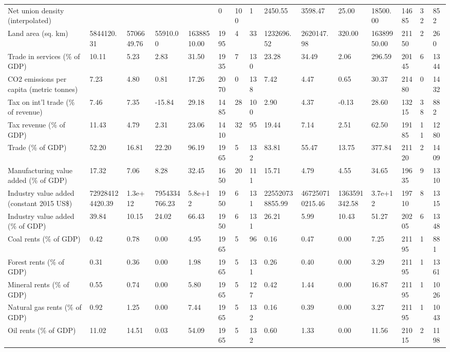 \begin{longtable}{lllllllllllllll}
Net union density (interpolated) &  &  &  &  & 0 & 100 & 1 & 2450.55 & 3598.47 & 25.00 & 18500.00 & 14685 & 32 & 852\\
Land area (sq. km) & 5844120.31 & 5706649.76 & 55910.00 & 16388510.00 & 1995 & 4 & 33 & 1232696.52 & 2620147.98 & 320.00 & 16389950.00 & 21150 & 2 & 260\\
\addlinespace
Trade in services (\% of GDP) & 10.11 & 5.23 & 2.83 & 31.50 & 1935 & 7 & 130 & 23.28 & 34.49 & 2.06 & 296.59 & 20145 & 6 & 1344\\
CO2 emissions per capita (metric tonnes) & 7.23 & 4.80 & 0.81 & 17.26 & 2070 & 0 & 138 & 7.42 & 4.47 & 0.65 & 30.37 & 21480 & 0 & 1432\\
Tax on int'l trade (\% of revenue) & 7.46 & 7.35 & -15.84 & 29.18 & 1485 & 28 & 100 & 2.90 & 4.37 & -0.13 & 28.60 & 13215 & 38 & 882\\
Tax revenue (\% of GDP) & 11.43 & 4.79 & 2.31 & 23.06 & 1410 & 32 & 95 & 19.44 & 7.14 & 2.51 & 62.50 & 19185 & 11 & 1280\\
Trade (\% of GDP) & 52.20 & 16.81 & 22.20 & 96.19 & 1965 & 5 & 132 & 83.81 & 55.47 & 13.75 & 377.84 & 21120 & 2 & 1409\\
\addlinespace
Manufacturing value added (\% of GDP) & 17.32 & 7.06 & 8.28 & 32.45 & 1650 & 20 & 111 & 15.71 & 4.79 & 4.55 & 34.65 & 19635 & 9 & 1310\\
Industry value added (constant 2015 US\$) & 729284124420.39 & 1.3e+12 & 7954334766.23 & 5.8e+12 & 1950 & 6 & 131 & 225520738855.99 & 467250710215.46 & 1363591342.58 & 3.7e+12 & 19710 & 8 & 1315\\
Industry value added (\% of GDP) & 39.84 & 10.15 & 24.02 & 66.43 & 1950 & 6 & 131 & 26.21 & 5.99 & 10.43 & 51.27 & 20205 & 6 & 1348\\
Coal rents (\% of GDP) & 0.42 & 0.78 & 0.00 & 4.95 & 1965 & 5 & 96 & 0.16 & 0.47 & 0.00 & 7.25 & 21195 & 1 & 881\\
Forest rents (\% of GDP) & 0.31 & 0.36 & 0.00 & 1.98 & 1965 & 5 & 131 & 0.26 & 0.40 & 0.00 & 3.29 & 21195 & 1 & 1361\\
\addlinespace
Mineral rents (\% of GDP) & 0.55 & 0.74 & 0.00 & 5.80 & 1965 & 5 & 127 & 0.42 & 1.44 & 0.00 & 16.87 & 21195 & 1 & 1026\\
Natural gas rents (\% of GDP) & 0.92 & 1.25 & 0.00 & 7.44 & 1965 & 5 & 132 & 0.16 & 0.39 & 0.00 & 3.27 & 21195 & 1 & 1043\\
Oil rents (\% of GDP) & 11.02 & 14.51 & 0.03 & 54.09 & 1965 & 5 & 132 & 0.60 & 1.33 & 0.00 & 11.56 & 21015 & 2 & 1198\\

\end{longtable}

